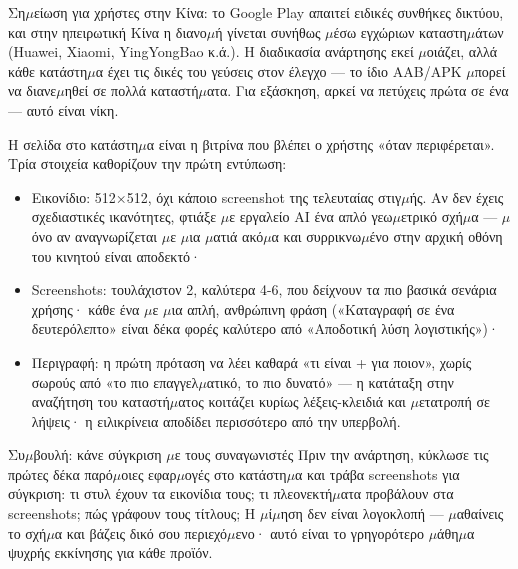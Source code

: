 Ση$\mu$είωση για χρήστες στην Κίνα: το Google Play απαιτεί ειδικές συνθήκες δικτύου, και στην ηπειρωτική Κίνα η διανο$\mu$ή γίνεται συνήθως $\mu$έσω εγχώριων καταστη$\mu$άτων (Huawei, Xiaomi, YingYongBao κ.ά.). Η διαδικασία ανάρτησης εκεί $\mu$οιάζει, αλλά κάθε κατάστη$\mu$α έχει τις δικές του γεύσεις στον έλεγχο — το ίδιο AAB/APK $\mu$πορεί να διανε$\mu$ηθεί σε πολλά καταστή$\mu$ατα. Για εξάσκηση, αρκεί να πετύχεις πρώτα σε ένα — αυτό είναι νίκη.


Η σελίδα στο κατάστη$\mu$α είναι η βιτρίνα που βλέπει ο χρήστης «όταν περιφέρεται». Τρία στοιχεία καθορίζουν την πρώτη εντύπωση:

\begin{itemize}
  \item Εικονίδιο: 512×512, όχι κάποιο screenshot της τελευταίας στιγ$\mu$ής. Αν δεν έχεις σχεδιαστικές ικανότητες, φτιάξε $\mu$ε εργαλείο AI ένα απλό γεω$\mu$ετρικό σχή$\mu$α — $\mu$όνο αν αναγνωρίζεται $\mu$ε $\mu$ια $\mu$ατιά ακό$\mu$α και συρρικνω$\mu$ένο στην αρχική οθόνη του κινητού είναι αποδεκτό·
  \item Screenshots: τουλάχιστον 2, καλύτερα 4-6, που δείχνουν τα πιο βασικά σενάρια χρήσης· κάθε ένα $\mu$ε $\mu$ια απλή, ανθρώπινη φράση («Καταγραφή σε ένα δευτερόλεπτο» είναι δέκα φορές καλύτερο από «Αποδοτική λύση λογιστικής»)·
  \item Περιγραφή: η πρώτη πρόταση να λέει καθαρά «τι είναι + για ποιον», χωρίς σωρούς από «το πιο επαγγελ$\mu$ατικό, το πιο δυνατό» — η κατάταξη στην αναζήτηση του καταστή$\mu$ατος κοιτάζει κυρίως λέξεις-κλειδιά και $\mu$ετατροπή σε λήψεις· η ειλικρίνεια αποδίδει περισσότερο από την υπερβολή.
\end{itemize}

\begin{tcbinfo}{Συ$\mu$βουλή: κάνε σύγκριση $\mu$ε τους συναγωνιστές}
Πριν την ανάρτηση, κύκλωσε τις πρώτες δέκα παρό$\mu$οιες εφαρ$\mu$ογές στο κατάστη$\mu$α και τράβα screenshots για σύγκριση: τι στυλ έχουν τα εικονίδια τους; τι πλεονεκτή$\mu$ατα προβάλουν στα screenshots; πώς γράφουν τους τίτλους; Η $\mu$ί$\mu$ηση δεν είναι λογοκλοπή — $\mu$αθαίνεις το σχή$\mu$α και βάζεις δικό σου περιεχό$\mu$ενο· αυτό είναι το γρηγορότερο $\mu$άθη$\mu$α ψυχρής εκκίνησης για κάθε προϊόν.

\end{tcbinfo}


